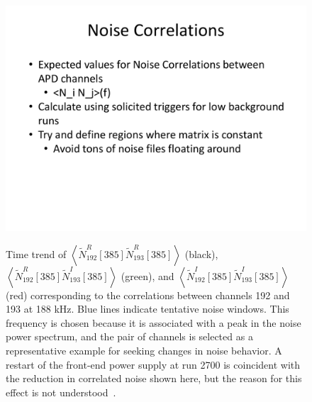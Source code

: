 \begin{figure}
\begin{center}
\includegraphics[keepaspectratio=true,page=6,width=\textwidth,clip=true,trim=0.2in 0.5in 0.5in 0.3in]{APD_Denoising_noise_correlations.pdf}
\end{center}
\renewcommand{\baselinestretch}{1}
\small\normalsize
\begin{quote}
\caption{Time trend of $\left<\widetilde{N}^R_{192}[385]\widetilde{N}^R_{193}[385]\right>$ (black), $\left<\widetilde{N}^R_{192}[385]\widetilde{N}^I_{193}[385]\right>$ (green), and $\left<\widetilde{N}^I_{192}[385]\widetilde{N}^I_{193}[385]\right>$ (red) corresponding to the correlations between channels 192 and 193 at 188 kHz.  Blue lines indicate tentative noise windows.  This frequency is chosen because it is associated with a peak in the noise power spectrum, and the pair of channels is selected as a representative example for seeking changes in noise behavior.  A restart of the front-end power supply at run 2700 is coincident with the reduction in correlated noise shown here, but the reason for this effect is not understood~\cite{MikeCoherentAPDNoise}.}
\label{fig:MikeNoise_192_193}
\end{quote}
\end{figure}
\renewcommand{\baselinestretch}{2}
\small\normalsize

